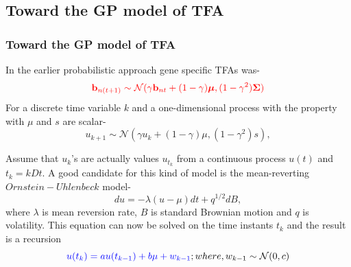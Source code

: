\documentclass{beamer}
\begin{document}
\subsection{Toward the GP model of TFA}
\begin{frame}
\frametitle{Toward the GP model of TFA}
In the earlier probabilistic approach gene specific TFAs was-
\begin{equation} \label{eq:tfa_SanG_updateCh4}
  {\color{red}\bold{b}_{n(t+1)} \sim \mathcal{N} (\gamma \bold{b}_{nt} + (1-\gamma)\boldsymbol{\mu},(1-\gamma^2)\bold{\Sigma})}
\end{equation}
For a {\color{blue}discrete time variable $k$} and a {\color{blue}one-dimensional process} with the property with $\mu$ and $s$ are scalar-
\begin{equation}
u_{k+1} \sim \mathcal{N}\left(\gamma u_k + \left(1 - \gamma\right) \mu, (1 - \gamma^2)s \right),
\end{equation}

Assume that {\color{blue}$u_k$'s are actually values $u_{t_k}$} from a continuous process $u(t)$ and $t_k = kDt$.
A good candidate for this kind of model is the mean-reverting $Ornstein-Uhlenbeck$ model-
\begin{equation}
du = -\lambda \left(u - \mu\right) dt + q^{1/2} dB,
\end{equation}
where $\lambda$ is mean reversion rate, $B$ is standard Brownian motion and $q$ is volatility. This equation can now be solved on the time instants $t_k$ and the result is a recursion
\begin{equation}
{\color{blue}u(t_k) = a u(t_{k-1}) + b \mu + w_{k-1}}; where, w_{k-1} \sim \mathcal{N}(0,c)
\end{equation}
 
\end{frame}
\end{document}
